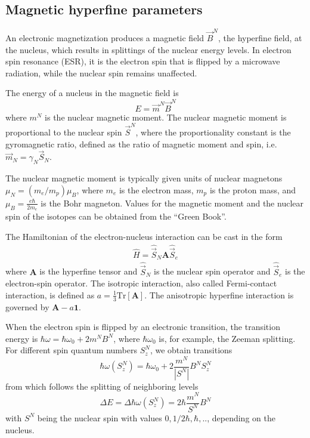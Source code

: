 \documentclass[final,12pt,makeidx,DIV=calc]{article}
\begin{document}
{{{%
\subsection{Magnetic hyperfine parameters}
An electronic magnetization produces a magnetic field $\vec{B}^N$, the
hyperfine field, at the nucleus, which results in splittings of the
nuclear energy levels.  In electron spin resonance (ESR), it is the
electron spin that is flipped by a microwave radiation, while the
nuclear spin remains unaffected.

The energy of a nucleus in the magnetic field is
\begin{displaymath}
E=\vec{m}^N \vec{B}^N
\end{displaymath}
where $m^N$ is the nuclear magnetic moment. The nuclear magnetic
moment is proportional to the nuclear spin $\vec{S}^N$, where the
proportionality constant is the gyromagnetic ratio, defined as the ratio of magnetic moment and spin,
i.e. $\vec{m}_N=\gamma_N \vec{S}_N$.

The nuclear magnetic moment is typically given units of nuclear
magnetons $\mu_N=(m_e/m_p)\mu_B$, where $m_e$ is the electron mass,
$m_p$ is the proton mass, and $\mu_B=\frac{e\hbar}{2m_e}$ is the Bohr
magneton.  Values for the magnetic moment and the nuclear spin of the
isotopes can be obtained from the ``Green Book''\cite{greenbook}.

The Hamiltonian of the electron-nucleus interaction can be cast in the form
\begin{eqnarray*}
\hat{H}=\hat{\vec{S}}_N\mathbf{A}\hat{\vec{S}}_e
\end{eqnarray*}
where $\mathbf{A}$ is the hyperfine tensor and $\hat{\vec{S}}_N$ is
the nuclear spin operator and $\hat{\vec{S}}_e$ is the electron-spin
operator. The isotropic interaction, also called Fermi-contact
interaction, is defined as $a=\frac{1}{3}\textrm{Tr}[\mathbf{A}]$. The
anisotropic hyperfine interaction is governed by
$\mathbf{A}-a\mathbf{1}$.

When the electron spin is flipped by an electronic transition, the
transition energy is $\hbar\omega=\hbar\omega_0+2m^NB^N$, where
$\hbar\omega_0$ is, for example, the Zeeman splitting. For different
spin quantum numbers $S^N_z$, we obtain transitions
\begin{equation}
\hbar\omega(S^N_z)=\hbar\omega_0+2\frac{m^N}{|S^N|}B^N S^N_z
\end{equation}
from which follows the splitting of neighboring levels
\begin{equation}
\Delta E=\Delta \hbar\omega(S^N_z)=2\hbar\frac{m^N}{S^N}B^N 
\end{equation}
with $S^N$ being the nuclear spin with values $0,1/2\hbar,\hbar,..$,
depending on the nucleus.


}}}
\end{document}
